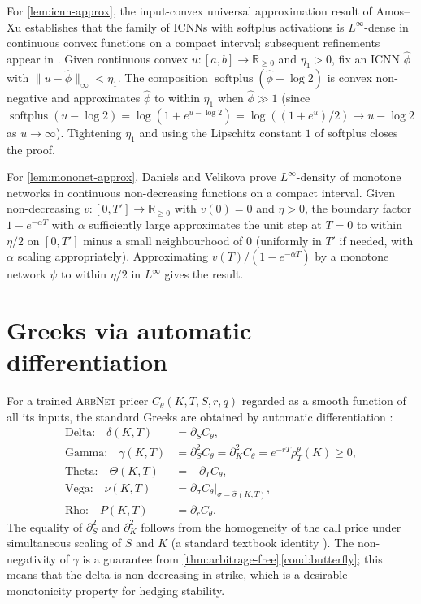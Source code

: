 \documentclass[largeformat]{interact}
\let\cite\citep   %
\theoremstyle{plain}
\theoremstyle{definition}
\newcommand{\R}{\mathbb{R}}
\DeclareMathOperator{\softplus}{softplus}
\newcommand{\arbnet}{\textsc{ArbNet}}
\begin{document}
For \cref{lem:icnn-approx}, the input-convex universal approximation result of Amos--Xu \citeyearpar{amos2017input} establishes that the family of ICNNs with softplus activations is $L^\infty$-dense in continuous convex functions on a compact interval; subsequent refinements appear in \cite{chen2018optimal,bunne2022supervised}. Given continuous convex $u : [a, b] \to \R_{\geq 0}$ and $\eta_1 > 0$, fix an ICNN $\widehat\phi$ with $\|u - \widehat\phi\|_\infty < \eta_1$. The composition $\softplus(\widehat\phi - \log 2)$ is convex non-negative and approximates $\widehat\phi$ to within $\eta_1$ when $\widehat\phi \gg 1$ (since $\softplus(u - \log 2) = \log(1 + e^{u - \log 2}) = \log((1 + e^u)/2) \to u - \log 2$ as $u \to \infty$). Tightening $\eta_1$ and using the Lipschitz constant $1$ of softplus closes the proof.

For \cref{lem:mononet-approx}, Daniels and Velikova \citeyearpar{daniels2010monotone} prove $L^\infty$-density of monotone networks in continuous non-decreasing functions on a compact interval. Given non-decreasing $v : [0, T'] \to \R_{\geq 0}$ with $v(0) = 0$ and $\eta > 0$, the boundary factor $1 - e^{-\alpha T}$ with $\alpha$ sufficiently large approximates the unit step at $T = 0$ to within $\eta/2$ on $[0, T']$ minus a small neighbourhood of $0$ (uniformly in $T'$ if needed, with $\alpha$ scaling appropriately). Approximating $v(T)/(1 - e^{-\alpha T})$ by a monotone network $\psi$ to within $\eta/2$ in $L^\infty$ gives the result.

\section{Greeks via automatic differentiation}
\label{app:greeks}

For a trained \arbnet{} pricer $C_\theta(K, T, S, r, q)$ regarded as a smooth function of all its inputs, the standard Greeks are obtained by automatic differentiation \cite{baydin2018autodiff}:
\begin{align}
\text{Delta:}  \quad \delta(K, T) &= \partial_S C_\theta, \\
\text{Gamma:}  \quad \gamma(K, T) &= \partial^2_S C_\theta = \partial^2_K C_\theta = e^{-rT} \rho^\theta_T(K) \geq 0, \\
\text{Theta:}  \quad \Theta(K, T) &= -\partial_T C_\theta, \\
\text{Vega:}   \quad \nu(K, T)    &= \partial_\sigma C_\theta\big|_{\sigma = \widehat\sigma(K, T)}, \\
\text{Rho:}    \quad P(K, T)     &= \partial_r C_\theta.
\end{align}
The equality of $\partial^2_S$ and $\partial^2_K$ follows from the homogeneity of the call price under simultaneous scaling of $S$ and $K$ (a standard textbook identity \cite{hull2018options}). The non-negativity of $\gamma$ is a guarantee from \cref{thm:arbitrage-free}\,\ref{cond:butterfly}; this means that the delta is non-decreasing in strike, which is a desirable monotonicity property for hedging stability.
\end{document}
